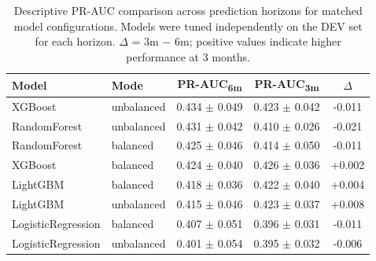 \begin{table}[ht]
\centering
\caption[PR-AUC comparison across prediction horizons]{Descriptive PR-AUC comparison across prediction horizons for matched model configurations. Models were tuned independently on the DEV set for each horizon. $\Delta$ = 3m $-$ 6m; positive values indicate higher performance at 3 months.}
\label{tab:3m_vs_6m}
\small
\begin{tabular}{llccc}
\toprule
Model & Mode & PR-AUC\textsubscript{6m} & PR-AUC\textsubscript{3m} & $\Delta$ \\
\midrule
XGBoost & unbalanced & 0.434 $\pm$ 0.049 & 0.423 $\pm$ 0.042 & -0.011 \\
RandomForest & unbalanced & 0.431 $\pm$ 0.042 & 0.410 $\pm$ 0.026 & -0.021 \\
RandomForest & balanced & 0.425 $\pm$ 0.046 & 0.414 $\pm$ 0.050 & -0.011 \\
XGBoost & balanced & 0.424 $\pm$ 0.040 & 0.426 $\pm$ 0.036 & +0.002 \\
LightGBM & balanced & 0.418 $\pm$ 0.036 & 0.422 $\pm$ 0.040 & +0.004 \\
LightGBM & unbalanced & 0.415 $\pm$ 0.046 & 0.423 $\pm$ 0.037 & +0.008 \\
LogisticRegression & balanced & 0.407 $\pm$ 0.051 & 0.396 $\pm$ 0.031 & -0.011 \\
LogisticRegression & unbalanced & 0.401 $\pm$ 0.054 & 0.395 $\pm$ 0.032 & -0.006 \\
\bottomrule
\end{tabular}
\end{table}
